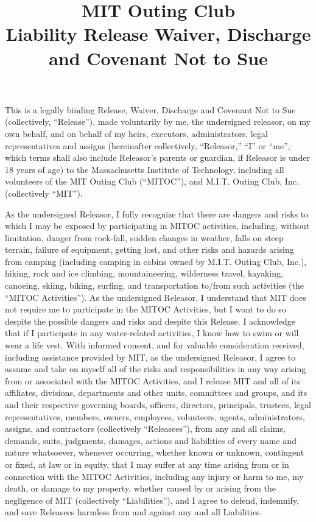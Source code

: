 \documentclass{article}
\title{MIT Outing Club\\Liability Release Waiver, Discharge and Covenant Not to Sue}
\begin{document}
\maketitle

This is a legally binding Release, Waiver, Discharge and Covenant Not to Sue
(collectively, ``Release''), made voluntarily by me, the undersigned releasor,
on my own behalf, and on behalf of my heirs, executors, administrators, legal
representatives and assigns (hereinafter collectively, ``Releasor,'' ``I'' or
``me'', which terms shall also include Releasor's parents or guardian, if
Releasor is under 18 years of age) to the Massachusetts Institute of
Technology, including all volunteers of the MIT Outing Club (``MITOC''), and
M.I.T. Outing Club, Inc. (collectively ``MIT'').

As the undersigned Releasor, I fully recognize that there are dangers and risks
to which I may be exposed by participating in MITOC activities, including,
without limitation, danger from rock-fall, sudden changes in weather, falls on
steep terrain, failure of equipment, getting lost, and other risks and hazards
arising from camping (including camping in cabins owned by M.I.T. Outing Club,
Inc.), hiking, rock and ice climbing, mountaineering, wilderness travel,
kayaking, canoeing, skiing, biking, surfing, and transportation to/from such
activities (the ``MITOC Activities''). As the undersigned Releasor, I
understand that MIT does not require me to participate in the MITOC Activities,
but I want to do so despite the possible dangers and risks and despite this
Release. I acknowledge that if I participate in any water-related activities, I
know how to swim or will wear a life vest. With informed consent, and for
valuable consideration received, including assistance provided by MIT, as the
undersigned Releasor, I agree to assume and take on myself all of the risks and
responsibilities in any way arising from or associated with the MITOC
Activities, and I release MIT and all of its affiliates, divisions, departments
and other units, committees and groups, and its and their respective governing
boards, officers, directors, principals, trustees, legal representatives,
members, owners, employees, volunteers, agents, administrators, assigns, and
contractors (collectively ``Releasees''), from any and all claims, demands,
suits, judgments, damages, actions and liabilities of every name and nature
whatsoever, whenever occurring, whether known or unknown, contingent or fixed,
at law or in equity, that I may suffer at any time arising from or in
connection with the MITOC Activities, including any injury or harm to me, my
death, or damage to my property, whether caused by or arising from the
negligence of MIT (collectively ``Liabilities''), and I agree to defend,
indemnify, and save Releasees harmless from and against any and all
Liabilities.
\end{document}
